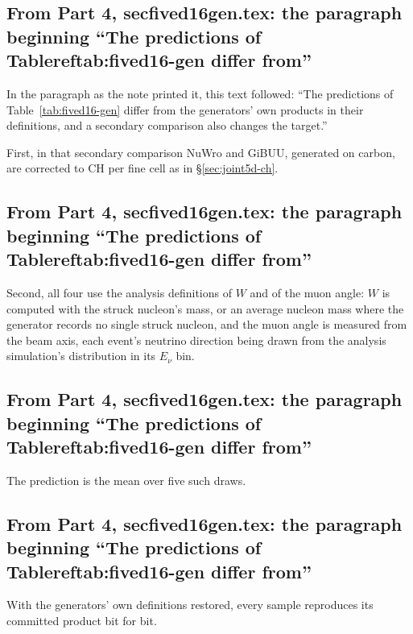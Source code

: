 \subsection{From Part 4, secfived16gen.tex: the paragraph beginning ``The predictions of Tablereftab:fived16-gen differ from''}
In the paragraph as the note printed it, this text followed: ``The predictions of Table~\ref{tab:fived16-gen} differ from the generators' own products in their definitions, and a secondary comparison also changes the target.''\par
First, in that secondary comparison NuWro and GiBUU, generated on carbon, are corrected to CH per fine cell as in \S\ref{sec:joint5d-ch}.

\subsection{From Part 4, secfived16gen.tex: the paragraph beginning ``The predictions of Tablereftab:fived16-gen differ from''}
Second, all four use the analysis definitions of $W$ and of the muon angle: $W$ is computed with the struck nucleon's mass, or an average nucleon mass where the generator records no single struck nucleon, and the muon angle is measured from the beam axis, each event's neutrino direction being drawn from the analysis simulation's distribution in its $E_\nu$ bin.

\subsection{From Part 4, secfived16gen.tex: the paragraph beginning ``The predictions of Tablereftab:fived16-gen differ from''}
The prediction is the mean over five such draws.

\subsection{From Part 4, secfived16gen.tex: the paragraph beginning ``The predictions of Tablereftab:fived16-gen differ from''}
With the generators' own definitions restored, every sample reproduces its committed product bit for bit.

